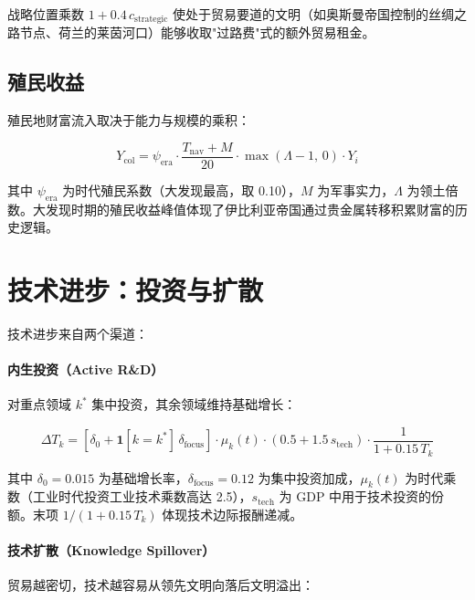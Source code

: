 \documentclass[12pt, a4paper]{article}
\begin{document}
战略位置乘数 $1 + 0.4\,c_{\text{strategic}}$ 使处于贸易要道的文明（如奥斯曼帝国控制的丝绸之路节点、荷兰的莱茵河口）能够收取"过路费"式的额外贸易租金。

\subsection{殖民收益}

殖民地财富流入取决于能力与规模的乘积：

\begin{equation}
Y_{\text{col}} = \psi_{\text{era}} \cdot \frac{T_{\text{nav}} + M}{20} \cdot \max(\Lambda - 1,\, 0) \cdot Y_i
\label{eq:colonial}
\end{equation}

其中 $\psi_{\text{era}}$ 为时代殖民系数（大发现最高，取 0.10），$M$ 为军事实力，$\Lambda$ 为领土倍数。大发现时期的殖民收益峰值体现了伊比利亚帝国通过贵金属转移积累财富的历史逻辑。

\section{技术进步：投资与扩散}

技术进步来自两个渠道：

\paragraph{内生投资（Active R\&D）}对重点领域 $k^*$ 集中投资，其余领域维持基础增长：

\begin{equation}
\Delta T_k = \left[\delta_0 + \mathbf{1}[k = k^*]\,\delta_{\text{focus}}\right] \cdot \mu_k(t) \cdot \left(0.5 + 1.5\,s_{\text{tech}}\right) \cdot \frac{1}{1 + 0.15\,T_k}
\label{eq:tech_invest}
\end{equation}

其中 $\delta_0 = 0.015$ 为基础增长率，$\delta_{\text{focus}} = 0.12$ 为集中投资加成，$\mu_k(t)$ 为时代乘数（工业时代投资工业技术乘数高达 2.5），$s_{\text{tech}}$ 为 GDP 中用于技术投资的份额。末项 $1/(1+0.15\,T_k)$ 体现技术边际报酬递减。

\paragraph{技术扩散（Knowledge Spillover）}贸易越密切，技术越容易从领先文明向落后文明溢出：
\end{document}
